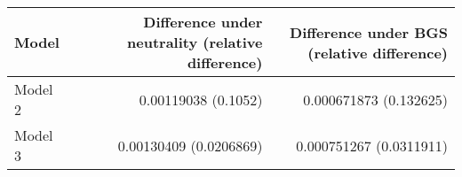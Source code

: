 \begin{tabular}{l r r}
\hline
Model & Difference under neutrality (relative difference) & Difference under BGS (relative difference)\\
\hline
Model 2 & 0.00119038 (0.1052) & 0.000671873 (0.132625)\\
Model 3 & 0.00130409 (0.0206869) & 0.000751267 (0.0311911)\\
\hline
\end{tabular}